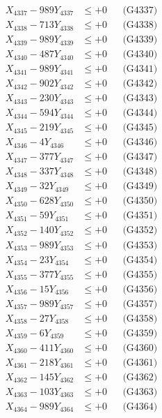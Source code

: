 \documentclass[a4paper,10pt]{article}
\begin{document}
{\begin{align}
X_{4337} - 989Y_{4337} &\leq +0 && \text{(G4337)} \\
X_{4338} - 713Y_{4338} &\leq +0 && \text{(G4338)} \\
X_{4339} - 989Y_{4339} &\leq +0 && \text{(G4339)} \\
X_{4340} - 487Y_{4340} &\leq +0 && \text{(G4340)} \\
\allowbreak
X_{4341} - 989Y_{4341} &\leq +0 && \text{(G4341)} \\
X_{4342} - 902Y_{4342} &\leq +0 && \text{(G4342)} \\
X_{4343} - 230Y_{4343} &\leq +0 && \text{(G4343)} \\
X_{4344} - 594Y_{4344} &\leq +0 && \text{(G4344)} \\
X_{4345} - 219Y_{4345} &\leq +0 && \text{(G4345)} \\
X_{4346} - 4Y_{4346} &\leq +0 && \text{(G4346)} \\
X_{4347} - 377Y_{4347} &\leq +0 && \text{(G4347)} \\
X_{4348} - 337Y_{4348} &\leq +0 && \text{(G4348)} \\
X_{4349} - 32Y_{4349} &\leq +0 && \text{(G4349)} \\
X_{4350} - 628Y_{4350} &\leq +0 && \text{(G4350)} \\
\allowbreak
X_{4351} - 59Y_{4351} &\leq +0 && \text{(G4351)} \\
X_{4352} - 140Y_{4352} &\leq +0 && \text{(G4352)} \\
X_{4353} - 989Y_{4353} &\leq +0 && \text{(G4353)} \\
X_{4354} - 23Y_{4354} &\leq +0 && \text{(G4354)} \\
X_{4355} - 377Y_{4355} &\leq +0 && \text{(G4355)} \\
X_{4356} - 15Y_{4356} &\leq +0 && \text{(G4356)} \\
X_{4357} - 989Y_{4357} &\leq +0 && \text{(G4357)} \\
X_{4358} - 27Y_{4358} &\leq +0 && \text{(G4358)} \\
X_{4359} - 6Y_{4359} &\leq +0 && \text{(G4359)} \\
X_{4360} - 411Y_{4360} &\leq +0 && \text{(G4360)} \\
\allowbreak
X_{4361} - 218Y_{4361} &\leq +0 && \text{(G4361)} \\
X_{4362} - 145Y_{4362} &\leq +0 && \text{(G4362)} \\
X_{4363} - 103Y_{4363} &\leq +0 && \text{(G4363)} \\
X_{4364} - 989Y_{4364} &\leq +0 && \text{(G4364)} \\

\end{align}}
\end{document}
